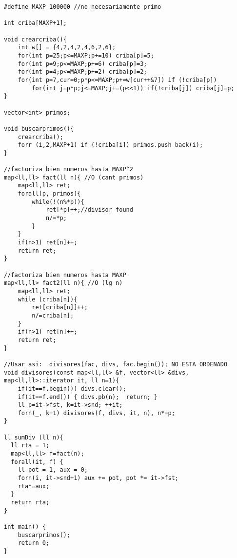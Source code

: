\begin{verbatim}
#define MAXP 100000	//no necesariamente primo

int criba[MAXP+1];

void crearcriba(){
	int w[] = {4,2,4,2,4,6,2,6};
	for(int p=25;p<=MAXP;p+=10) criba[p]=5;
	for(int p=9;p<=MAXP;p+=6) criba[p]=3; 
	for(int p=4;p<=MAXP;p+=2) criba[p]=2;
	for(int p=7,cur=0;p*p<=MAXP;p+=w[cur++&7]) if (!criba[p]) 
		for(int j=p*p;j<=MAXP;j+=(p<<1)) if(!criba[j]) criba[j]=p;
}

vector<int> primos;

void buscarprimos(){
	crearcriba();
	forr (i,2,MAXP+1) if (!criba[i]) primos.push_back(i);
}

//factoriza bien numeros hasta MAXP^2
map<ll,ll> fact(ll n){ //O (cant primos)
	map<ll,ll> ret;
	forall(p, primos){
		while(!(n%*p)){
			ret[*p]++;//divisor found
			n/=*p;
		}
	}
	if(n>1) ret[n]++;
	return ret;
}

//factoriza bien numeros hasta MAXP
map<ll,ll> fact2(ll n){ //O (lg n)
	map<ll,ll> ret;
	while (criba[n]){
		ret[criba[n]]++;
		n/=criba[n];
	}
	if(n>1) ret[n]++;
	return ret;
}

//Usar asi:  divisores(fac, divs, fac.begin()); NO ESTA ORDENADO
void divisores(const map<ll,ll> &f, vector<ll> &divs, map<ll,ll>::iterator it, ll n=1){
    if(it==f.begin()) divs.clear();
    if(it==f.end()) { divs.pb(n);  return; }
    ll p=it->fst, k=it->snd; ++it;
    forn(_, k+1) divisores(f, divs, it, n), n*=p;
}

ll sumDiv (ll n){
  ll rta = 1;
  map<ll,ll> f=fact(n);
  forall(it, f) {
	ll pot = 1, aux = 0;  
	forn(i, it->snd+1) aux += pot, pot *= it->fst;
	rta*=aux;
  } 
  return rta;
}

int main() {
	buscarprimos();
	return 0;
}
\end{verbatim}